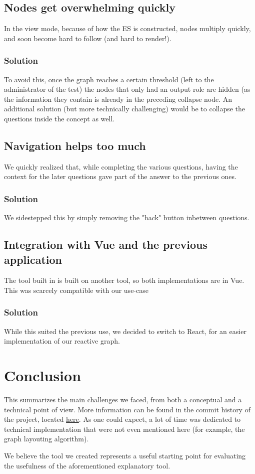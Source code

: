 \documentclass{article}
\begin{document}
\subsection{Nodes get overwhelming quickly}
In the view mode, because of how the ES is constructed, nodes multiply quickly, and soon become hard to follow (and hard to render!).
\subsubsection{Solution}
To avoid this, once the graph reaches a certain threshold (left to the administrator of the test) the nodes that only had an output role are hidden (as the information they contain is already in the preceding collapse node. An additional solution (but more technically challenging) would be to collapse the questions inside the concept as well.

\subsection{Navigation helps too much}
We quickly realized that, while completing the various questions, having the context for the later questions gave part of the answer to the previous ones.
\subsubsection{Solution}
We sidestepped this by simply removing the "back" button inbetween questions.

\subsection{Integration with Vue and the previous application}
The tool built in \cite{sovrano2021philosophy} is built on another tool, so both implementations are in Vue. This was scarcely compatible with our use-case
\subsubsection{Solution}
While this suited the previous use, we decided to switch to React, for an easier implementation of our reactive graph.

\section{Conclusion}
This summarizes the main challenges we faced, from both a conceptual and a technical point of view. More information can be found in the commit history of the project, located \href{https://github.com/pollomarzo/internship-2021}{here}. As one could expect, a lot of time was dedicated to technical implementation that were not even mentioned here (for example, the graph layouting algorithm).

We believe the tool we created represents a useful starting point for evaluating the usefulness of the aforementioned explanatory tool.





\end{document}
